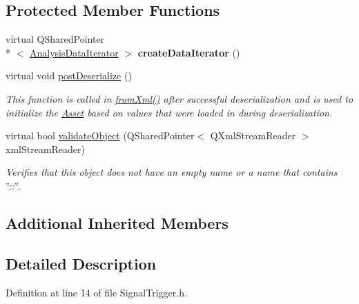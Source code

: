 \subsection*{Protected Member Functions}
\begin{DoxyCompactItemize}
\item 
\hypertarget{class_picto_1_1_signal_trigger_aba06633f17f43af53ee7e74569c33462}{virtual Q\-Shared\-Pointer\\*
$<$ \hyperlink{class_picto_1_1_analysis_data_iterator}{Analysis\-Data\-Iterator} $>$ {\bfseries create\-Data\-Iterator} ()}\label{class_picto_1_1_signal_trigger_aba06633f17f43af53ee7e74569c33462}

\item 
virtual void \hyperlink{class_picto_1_1_signal_trigger_a55d46c3c72ff98b9b6ed856ba1af384a}{post\-Deserialize} ()
\begin{DoxyCompactList}\small\item\em This function is called in \hyperlink{class_picto_1_1_asset_a8bed4da09ecb1c07ce0dab313a9aba67}{from\-Xml()} after successful deserialization and is used to initialize the \hyperlink{class_picto_1_1_asset}{Asset} based on values that were loaded in during deserialization. \end{DoxyCompactList}\item 
\hypertarget{class_picto_1_1_signal_trigger_ab40ec576a63376e26fc96da66953fce5}{virtual bool \hyperlink{class_picto_1_1_signal_trigger_ab40ec576a63376e26fc96da66953fce5}{validate\-Object} (Q\-Shared\-Pointer$<$ Q\-Xml\-Stream\-Reader $>$ xml\-Stream\-Reader)}\label{class_picto_1_1_signal_trigger_ab40ec576a63376e26fc96da66953fce5}

\begin{DoxyCompactList}\small\item\em Verifies that this object does not have an empty name or a name that contains \char`\"{}\-::\char`\"{}. \end{DoxyCompactList}\end{DoxyCompactItemize}
\subsection*{Additional Inherited Members}


\subsection{Detailed Description}


Definition at line 14 of file Signal\-Trigger.\-h.



